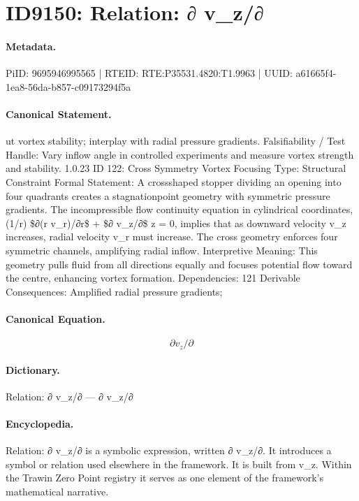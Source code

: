 \section*{ID9150: Relation: ∂ v\_z/∂}
\paragraph{Metadata.}
PiID: 9695946995565 | RTEID: RTE:P35531.4820:T1.9963 | UUID: a61665f4-1ea8-56da-b857-c09173294f5a

\paragraph{Canonical Statement.}
ut vortex stability; interplay with radial pressure gradients. Falsifiability / Test Handle: Vary inflow angle in controlled experiments and measure vortex strength and stability. 1.0.23 ID 122: Cross Symmetry Vortex Focusing Type: Structural Constraint Formal Statement: A crossshaped stopper dividing an opening into four quadrants creates a stagnationpoint geometry with symmetric pressure gradients. The incompressible flow continuity equation in cylindrical coordinates, (1/r) \$∂(r v\_r)/∂r\$ + \$∂ v\_z/∂\$ z = 0, implies that as downward velocity v\_z increases, radial velocity v\_r must increase. The cross geometry enforces four symmetric channels, amplifying radial inflow. Interpretive Meaning: This geometry pulls fluid from all directions equally and focuses potential flow toward the centre, enhancing vortex formation. Dependencies: 121 Derivable Consequences: Amplified radial pressure gradients;

\paragraph{Canonical Equation.}
\[
∂ v_z/∂
\]

\paragraph{Dictionary.}
Relation: ∂ v\_z/∂ — ∂ v\_z/∂

\paragraph{Encyclopedia.}
Relation: ∂ v\_z/∂ is a symbolic expression, written ∂ v\_z/∂. It introduces a symbol or relation used elsewhere in the framework. It is built from v\_z. Within the Trawin Zero Point registry it serves as one element of the framework's mathematical narrative.
